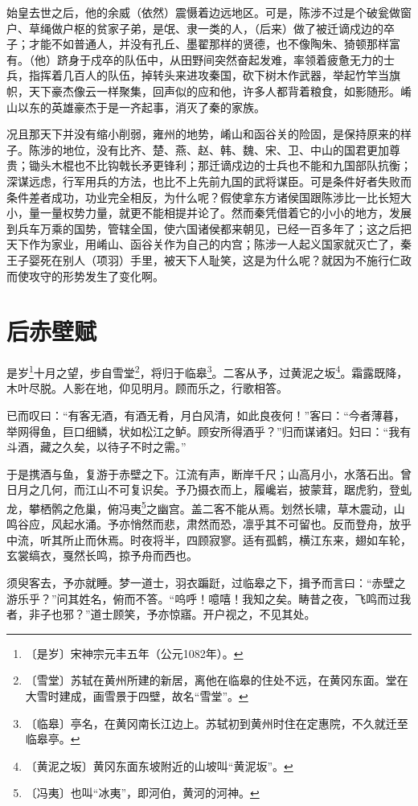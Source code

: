 \documentclass[12pt,UTF-8,openany]{ctexbook}
\begin{document}
\begin{normalsize}
    始皇去世之后，他的余威（依然）震慑着边远地区。可是，陈涉不过是个破瓮做窗户、草绳做户枢的贫家子弟，是氓、隶一类的人，（后来）做了被迁谪戍边的卒子；才能不如普通人，并没有孔丘、墨翟那样的贤德，也不像陶朱、猗顿那样富有。（他）跻身于戍卒的队伍中，从田野间突然奋起发难，率领着疲惫无力的士兵，指挥着几百人的队伍，掉转头来进攻秦国，砍下树木作武器，举起竹竿当旗帜，天下豪杰像云一样聚集，回声似的应和他，许多人都背着粮食，如影随形。崤山以东的英雄豪杰于是一齐起事，消灭了秦的家族。
    
    况且那天下并没有缩小削弱，雍州的地势，崤山和函谷关的险固，是保持原来的样子。陈涉的地位，没有比齐、楚、燕、赵、韩、魏、宋、卫、中山的国君更加尊贵；锄头木棍也不比钩戟长矛更锋利；那迁谪戍边的士兵也不能和九国部队抗衡；深谋远虑，行军用兵的方法，也比不上先前九国的武将谋臣。可是条件好者失败而条件差者成功，功业完全相反，为什么呢？假使拿东方诸侯国跟陈涉比一比长短大小，量一量权势力量，就更不能相提并论了。然而秦凭借着它的小小的地方，发展到兵车万乘的国势，管辖全国，使六国诸侯都来朝见，已经一百多年了；这之后把天下作为家业，用崤山、函谷关作为自己的内宫；陈涉一人起义国家就灭亡了，秦王子婴死在别人（项羽）手里，被天下人耻笑，这是为什么呢？就因为不施行仁政而使攻守的形势发生了变化啊。
    
\end{normalsize}



\chapter{后赤壁赋}

\begin{normalsize}
    
    是岁\footnote{〔是岁〕宋神宗元丰五年（公元1082年）。}十月之望，步自雪堂\footnote{〔雪堂〕苏轼在黄州所建的新居，离他在临皋的住处不远，在黄冈东面。堂在大雪时建成，画雪景于四壁，故名“雪堂”。}，将归于临皋\footnote{〔临皋〕亭名，在黄冈南长江边上。苏轼初到黄州时住在定惠院，不久就迁至临皋亭。}。二客从予，过黄泥之坂\footnote{〔黄泥之坂〕黄冈东面东坡附近的山坡叫“黄泥坂”。}。霜露既降，木叶尽脱。人影在地，仰见明月。顾而乐之，行歌相答。
    
    已而叹曰：“有客无酒，有酒无肴，月白风清，如此良夜何！”客曰：“今者薄暮，举网得鱼，巨口细鳞，状如松江之鲈。顾安所得酒乎？”归而谋诸妇。妇曰：“我有斗酒，藏之久矣，以待子不时之需。”
    
    于是携酒与鱼，复游于赤壁之下。江流有声，断岸千尺；山高月小，水落石出。曾日月之几何，而江山不可复识矣。予乃摄衣而上，履巉岩，披蒙茸，踞虎豹，登虬龙，攀栖鹘之危巢，俯冯夷\footnote{〔冯夷〕也叫“冰夷”，即河伯，黄河的河神。}之幽宫。盖二客不能从焉。划然长啸，草木震动，山鸣谷应，风起水涌。予亦悄然而悲，肃然而恐，凛乎其不可留也。反而登舟，放乎中流，听其所止而休焉。时夜将半，四顾寂寥。适有孤鹤，横江东来，翅如车轮，玄裳缟衣，戛然长鸣，掠予舟而西也。
    
    须臾客去，予亦就睡。梦一道士，羽衣蹁跹，过临皋之下，揖予而言曰：“赤壁之游乐乎？”问其姓名，俯而不答。“呜呼！噫嘻！我知之矣。畴昔之夜，飞鸣而过我者，非子也邪？”道士顾笑，予亦惊寤。开户视之，不见其处。
\end{normalsize}
\end{document}
